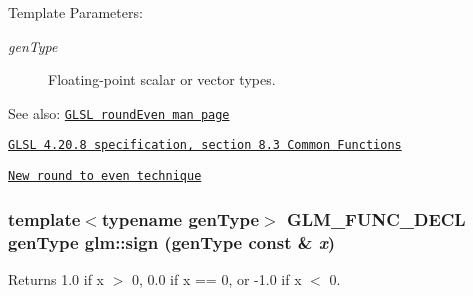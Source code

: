\begin{Desc}
\item[Template Parameters:]
\begin{description}
\item[{\em genType}]Floating-point scalar or vector types.\end{description}
\end{Desc}
\begin{Desc}
\item[See also:]\href{http://www.opengl.org/sdk/docs/manglsl/xhtml/roundEven.xml}{\tt GLSL roundEven man page} 

\href{http://www.opengl.org/registry/doc/GLSLangSpec.4.20.8.pdf}{\tt GLSL 4.20.8 specification, section 8.3 Common Functions} 

\href{http://developer.amd.com/documentation/articles/pages/New-Round-to-Even-Technique.aspx}{\tt New round to even technique} \end{Desc}
\hypertarget{group__core__func__common_g74ce53889485c33ac9d81d2b27165c80}{
\subsubsection[sign]{\setlength{\rightskip}{0pt plus 5cm}template$<$typename genType$>$ GLM\_\-FUNC\_\-DECL genType glm::sign (genType const \& {\em x})}}
\label{group__core__func__common_g74ce53889485c33ac9d81d2b27165c80}


Returns 1.0 if x $>$ 0, 0.0 if x == 0, or -1.0 if x $<$ 0.

